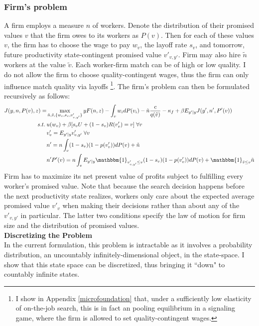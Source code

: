 \subsubsection*{Firm's problem}
A firm employs a measure $n$ of workers. Denote the distribution of their promised values $v$ that the firm owes to its workers as $P(v)$. Then for each of these values $v$, the firm has to choose the wage to pay $w_v$, the layoff rate $s_v$, and tomorrow, future productivity state-contingent promised value $v'_{v,y'}$. Firm may also hire $\tilde{n}$ workers at the value $\tilde{v}$. Each worker-firm match can be of high or low quality. I do not allow the firm to choose quality-contingent wages, thus the firm can only influence match quality via layoffs \footnote{I show in Appendix \ref{microfoundation} that, under a sufficiently low elasticity of on-the-job search, this is in fact an pooling equilibrium in a signaling game, where the firm is allowed to set quality-contingent wages.}.
The firm's problem can then be formulated recursively as follows:
\begin{equation*}
    \begin{split}
    J(y,n,P(v),z) = & \max_{\tilde{n},\tilde{v},\{w_v,s_v,v'_{v,y'}\}} yF(n,z) - \int_v w_i dP(v_i) -\tilde{n}\frac{c}{q(\tilde{v})} -\kappa_f+ \beta E_{y'|y} J(y',n',P'(v)) \\
     s.t. \: & u(w_v) + \beta [s_v U + (1-s_v)R(v'_{v})=v] \; \forall v \\
    & v'_v = E_{y'|y} v'_{v,y'} \; \forall v \\
    & n' = n\int_v (1-s_v)(1-p(v'_v))dP(v)+\tilde{n} \\
    & n'P'(v) = n\int_v E_{y'|y}\mathbbm{1}_{v'_{v,y'}\leq v} (1-s_v)(1-p(v'_v))dP(v)+\mathbbm{1}_{\tilde{v}\leq v}\tilde{n}
    \end{split}
\end{equation*}
Firm has to maximize its net present value of profits subject to fulfilling every worker's promised value. 
Note that because the search decision happens before the next productivity state realizes, workers only care about the expected average promised value $v'_v$ when making their decisions rather than about any of the $v'_{v,y'}$ in particular. The latter two conditions specify the law of motion for firm size and the distribution of promised values. \\
\textbf{Discretizing the Problem} \label{subsection:discrete} \\
In the current formulation, this problem is intractable as it involves a probability distribution, an uncountably infinitely-dimensional object, in the state-space. I show that this state space can be discretized, thus bringing it ``down" to countably infinite states.\\
